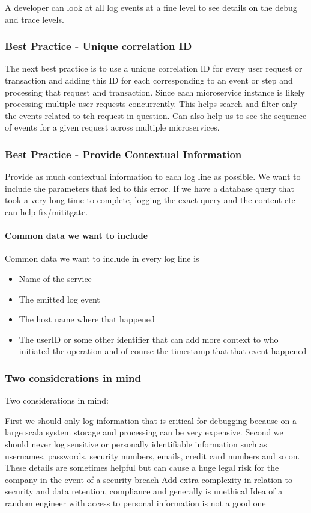 A developer can look at all log events at a fine level to see details on the debug and trace levels.

\subsubsection{Best Practice - Unique correlation ID}
The next best practice is to use a unique correlation ID for every user request or transaction and adding this ID for each corresponding to an event or step and processing that request and transaction.
Since each microservice instance is likely processing multiple user requests concurrently.
This helps search and filter only the events related to teh request in question.
Can also help us to see the sequence of events for a given request across multiple microservices.

\subsubsection{Best Practice - Provide Contextual Information}
Provide as much contextual information to each log line as possible.
We want to include the parameters that led to this error.
If we have a database query that took a very long time to complete, logging the exact query and the content etc can help fix/mititgate.

\paragraph{Common data we want to include}
Common data we want to include in every log line is
\begin{itemize}
    \item Name of the service
    \item The emitted log event
    \item The host name where that happened
    \item The userID or some other identifier that can add more context to who initiated the operation and of course the timestamp that that event happened
\end{itemize}

\subsubsection{Two considerations in mind}
Two considerations in mind:

First we should only log information that is critical for debugging because on a large scala system storage and processing can be very expensive.
Second we should never log sensitive or personally identifiable information such as usernames, passwords, security numbers, emails, credit card numbers and so on.
These details are sometimes helpful but can cause a huge legal risk for the company in the event of a security breach
Add extra complexity in relation to security and data retention, compliance and generally is unethical
Idea of a random engineer with access to personal information is not a good one

